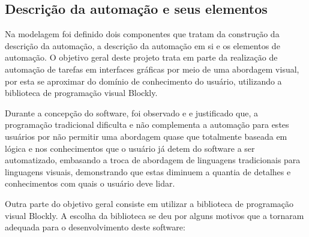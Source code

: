 \documentclass[tg]{mdtufsm}
\begin{document}
            \subsection {Descrição da automação e seus elementos}

                Na modelagem foi definido dois componentes que tratam da construção da descrição da automação, a descrição da automação em si e os elementos de automação. O objetivo geral deste projeto trata em parte da realização de automação de tarefas em interfaces gráficas por meio de uma abordagem visual, por esta se aproximar do domínio de conhecimento do usuário, utilizando a biblioteca de programação visual Blockly.

                Durante a concepção do software, foi observado e e justificado que, a programação tradicional dificulta e não complementa a automação para estes usuários por não permitir uma abordagem quase que totalmente baseada em lógica e nos conhecimentos que o usuário já detem do software a ser automatizado, embasando a troca de abordagem de linguagens tradicionais para linguagens visuais, demonstrando que estas diminuem a quantia de detalhes e conhecimentos com quais o usuário deve lidar.

                Outra parte do objetivo geral consiste em utilizar a biblioteca de programação visual Blockly. A escolha da biblioteca se deu por alguns motivos que a tornaram adequada para o desenvolvimento deste software:
\end{document}
